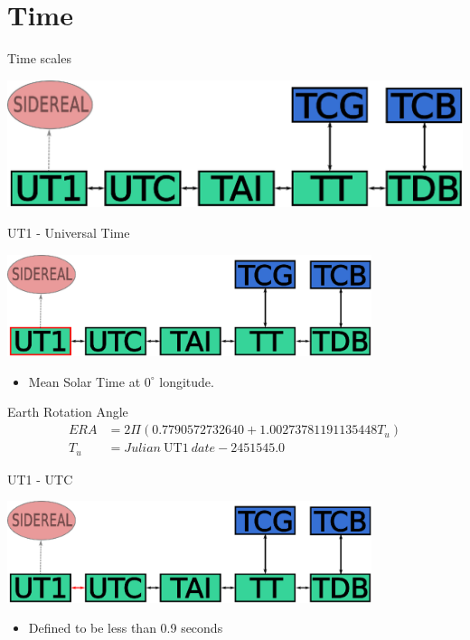 \documentclass[14pt,table,t, c]{beamer}
\begin{document}
\part{Time}

\begin{frame}{Time scales}
\vfill
\begin{center}
	\includegraphics[width=\textwidth]{figure/time}
\end{center}
\end{frame}

\begin{frame}{UT1 - Universal Time}
\begin{center}
	\includegraphics[width=0.8\textwidth]{figure/ut1}
\end{center}
\begin{itemize}
\item Mean Solar Time at $0^{\circ}$ longitude. 
\end{itemize}
\vfill
\begin{block}{Earth Rotation Angle}
\small\vspace*{-\baselineskip}\setlength\belowdisplayskip{0pt}\setlength\abovedisplayskip{0pt}
\begin{align*}
ERA &= 2\Pi(0.7790572732640 + 1.00273781191135448T_u) \\
T_u &= Julian \: \text{UT1} \: date - 2451545.0
\end{align*}
\end{block}
\end{frame}

\begin{frame}{UT1 - UTC}
\begin{center}
	\includegraphics[width=0.8\textwidth]{figure/ut1_utc}
\end{center}
\begin{itemize}
\item Defined to be less than 0.9 seconds 
\end{itemize}
\end{frame}
\end{document}
